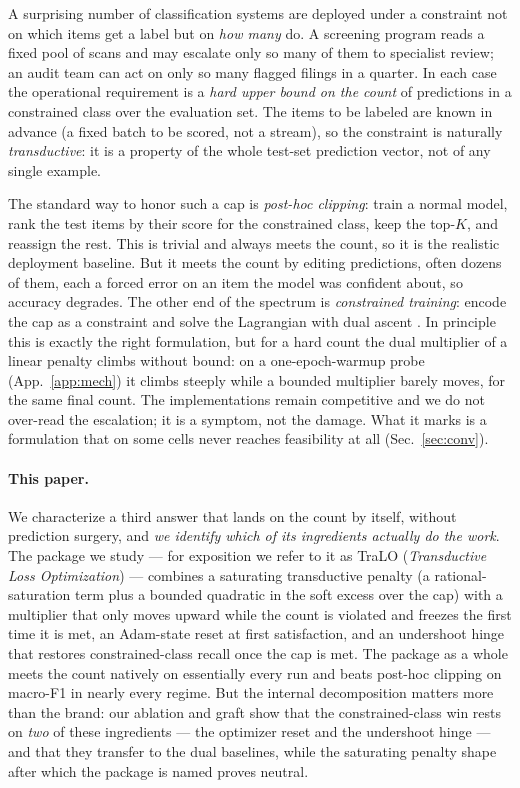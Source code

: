 \documentclass[10pt]{article}
\begin{document}
A surprising number of classification systems are deployed under a constraint
not on which items get a label but on \emph{how many} do. A screening program
reads a fixed pool of scans and may escalate only so many of them to
specialist review; an audit team can act on only so many flagged filings in a
quarter. In each case the operational requirement is a
\emph{hard upper bound on the count} of predictions in a constrained class over
the evaluation set. The items to be labeled are known in advance (a fixed
batch to be scored, not a stream), so the constraint is naturally
\emph{transductive}: it is a property of the whole test-set prediction vector,
not of any single example.

The standard way to honor such a cap is \emph{post-hoc clipping}: train a normal
model, rank the test items by their score for the constrained class, keep the
top-$K$, and reassign the rest. This is trivial and always meets the count, so
it is the realistic deployment baseline. But it meets the count by editing
predictions, often dozens of them, each a forced error on an item the model was
confident about, so accuracy degrades. The other end of the spectrum is
\emph{constrained training}: encode the cap as a constraint and solve the
Lagrangian with dual ascent
\citep{fioretto2020lagrangian,hounie2023resilient,chamon2020probably}. In
principle this is exactly the right formulation, but for a hard count the dual
multiplier of a linear penalty climbs without bound: on a one-epoch-warmup
probe (App.~\ref{app:mech}) it climbs steeply while a bounded multiplier
barely moves, for the same final count. The implementations remain competitive
and we do not over-read the escalation; it is a symptom, not the damage. What
it marks is a formulation that on some cells never reaches feasibility at all
(Sec.~\ref{sec:conv}).

\paragraph{This paper.} We characterize a third answer that lands on the count
by itself, without prediction surgery, and \emph{we identify which of its
ingredients actually do the work}. The package we study --- for exposition we
refer to it as TraLO (\emph{Transductive Loss Optimization}) --- combines a
saturating transductive penalty (a rational-saturation term plus a bounded
quadratic in the soft excess over the cap) with a multiplier that only moves
upward while the count is violated and freezes the first time it is met, an
Adam-state reset at first satisfaction, and an undershoot hinge that restores
constrained-class recall once the cap is met. The package as a whole meets the
count natively on essentially every run and beats post-hoc clipping on macro-F1
in nearly every regime. But the internal decomposition matters more than the
brand: our ablation and graft show that the constrained-class win rests on
\emph{two} of these ingredients --- the optimizer reset and the undershoot
hinge --- and that they transfer to the dual baselines, while the saturating
penalty shape after which the package is named proves neutral.
\end{document}
